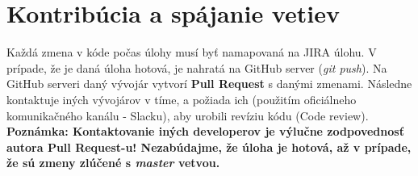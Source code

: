 \documentclass{article}
\begin{document}
    \pagebreak
    \section*{Kontribúcia a spájanie vetiev}

        \textnormal{%
        Každá zmena v kóde počas úlohy musí byť namapovaná na JIRA úlohu. V prípade, že je daná úloha hotová, je nahratá na GitHub server (\emph{git push}). Na GitHub serveri daný vývojár vytvorí \textbf{Pull Request} s danými zmenami. Následne kontaktuje iných vývojárov v tíme, a požiada ich (použitím oficiálneho komunikačného kanálu - Slacku), aby urobili revíziu kódu (Code review).\\
        \textbf{Poznámka: Kontaktovanie iných developerov je výlučne zodpovednosť autora Pull Request-u! Nezabúdajme, že úloha je hotová, až v prípade, že sú zmeny zlúčené s \emph{master} vetvou.}
        }
\end{document}
